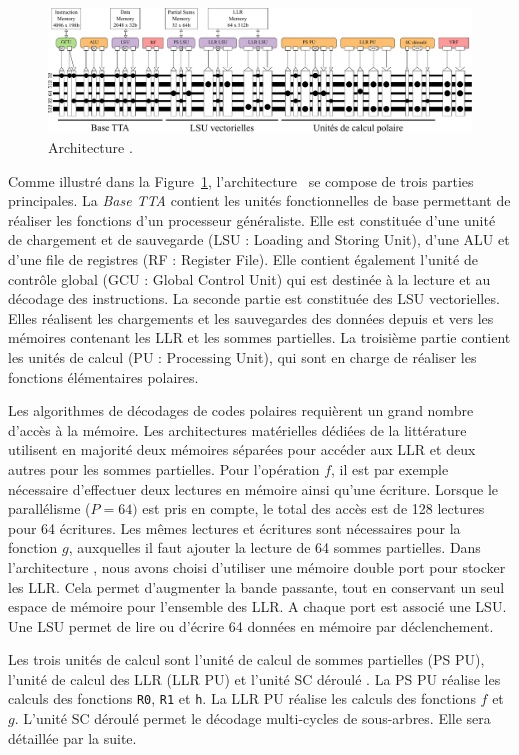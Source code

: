 \begin{figure}[t]
	\centering
	\includegraphics[width=\textwidth]{main/ch4_fig/archi_sc}
	\caption{Architecture \TTSC.}
	\label{fig:prode}
\end{figure}

Comme illustré dans la Figure~\ref{fig:prode}, l'architecture \TTSC~se compose de trois parties principales. La \textit{Base TTA} contient les unités fonctionnelles de base permettant de réaliser les fonctions d'un processeur généraliste. Elle est constituée d'une unité de chargement et de sauvegarde (LSU : Loading and Storing Unit), d'une ALU et d'une file de registres (RF : Register File). Elle contient également l'unité de contrôle global (GCU : Global Control Unit) qui est destinée à la lecture et au décodage des instructions. La seconde partie est constituée des LSU vectorielles. Elles réalisent les chargements et les sauvegardes des données depuis et vers les mémoires contenant les LLR et les sommes partielles.
La troisième partie contient les unités de calcul (PU : Processing Unit), qui sont en charge de réaliser les fonctions élémentaires polaires.

Les algorithmes de décodages de codes polaires requièrent un grand nombre d'accès à la mémoire. Les architectures matérielles dédiées de la littérature utilisent en majorité deux mémoires séparées pour accéder aux LLR et deux autres pour les sommes partielles. Pour l'opération $f$, il est par exemple nécessaire d'effectuer deux lectures en mémoire ainsi qu'une écriture. Lorsque le parallélisme ($P=64)$ est pris en compte, le total des accès est de 128 lectures pour 64 écritures. Les mêmes lectures et écritures sont nécessaires pour la fonction $g$, auxquelles il faut ajouter la lecture de 64 sommes partielles. Dans l'architecture \TTSC, nous avons choisi d'utiliser une mémoire double port pour stocker les LLR. Cela permet d'augmenter la bande passante, tout en conservant un seul espace de mémoire pour l'ensemble des LLR. A chaque port est associé une LSU. Une LSU permet de lire ou d'écrire 64 données en mémoire par déclenchement.

Les trois unités de calcul sont l'unité de calcul de sommes partielles (PS PU), l'unité de calcul des LLR (LLR PU) et l'unité \og SC déroulé \fg. La PS PU réalise les calculs des fonctions \texttt{R0}, \texttt{R1} et \texttt{h}. La LLR PU réalise les calculs des fonctions $f$ et $g$. L'unité \og SC déroulé \fg permet le décodage multi-cycles de sous-arbres. Elle sera détaillée par la suite. 

